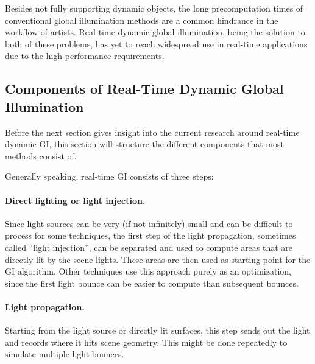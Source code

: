 Besides not fully supporting dynamic objects, the long precomputation times of conventional global illumination methods are a common hindrance in the workflow of artists. Real-time dynamic global illumination, being the solution to both of these problems, has yet to reach widespread use in real-time applications due to the high performance requirements.


\subsection{Components of Real-Time Dynamic Global Illumination}
\label{sec:intro:gi:components}

Before the next section gives insight into the current research around real-time dynamic GI, this section will structure the different components that most methods consist of.

Generally speaking, real-time GI consists of three steps:

\paragraph{Direct lighting or light injection.}
Since light sources can be very (if not infinitely) small and can be difficult to process for some techniques, the first step of the light propagation, sometimes called ``light injection'', can be separated and used to compute areas that are directly lit by the scene lights. These areas are then used as starting point for the GI algorithm. Other techniques use this approach purely as an optimization, since the first light bounce can be easier to compute than subsequent bounces.

\paragraph{Light propagation.}
Starting from the light source or directly lit surfaces, this step sends out the light and records where it hits scene geometry. This might be done repeatedly to simulate multiple light bounces.

